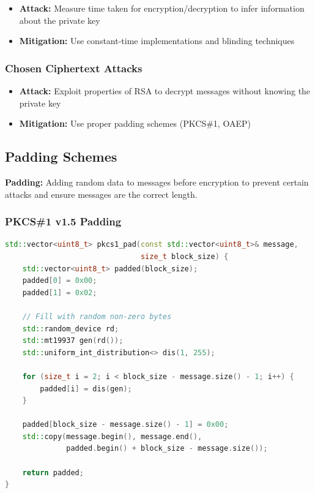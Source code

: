 \documentclass[11pt,a4paper]{article}
\begin{document}
\begin{itemize}
    \item \textbf{Attack:} Measure time taken for encryption/decryption to infer information about the private key
    \item \textbf{Mitigation:} Use constant-time implementations and blinding techniques
\end{itemize}

\subsubsection{Chosen Ciphertext Attacks}

\begin{itemize}
    \item \textbf{Attack:} Exploit properties of RSA to decrypt messages without knowing the private key
    \item \textbf{Mitigation:} Use proper padding schemes (PKCS\#1, OAEP)
\end{itemize}

\subsection{Padding Schemes}

\begin{definitionbox}
\textbf{Padding:} Adding random data to messages before encryption to prevent certain attacks and ensure messages are the correct length.
\end{definitionbox}

\subsubsection{PKCS\#1 v1.5 Padding}

\begin{lstlisting}[language=C++, caption=PKCS#1 v1.5 Padding]
std::vector<uint8_t> pkcs1_pad(const std::vector<uint8_t>& message, 
                               size_t block_size) {
    std::vector<uint8_t> padded(block_size);
    padded[0] = 0x00;
    padded[1] = 0x02;
    
    // Fill with random non-zero bytes
    std::random_device rd;
    std::mt19937 gen(rd());
    std::uniform_int_distribution<> dis(1, 255);
    
    for (size_t i = 2; i < block_size - message.size() - 1; i++) {
        padded[i] = dis(gen);
    }
    
    padded[block_size - message.size() - 1] = 0x00;
    std::copy(message.begin(), message.end(), 
              padded.begin() + block_size - message.size());
    
    return padded;
}
\end{lstlisting}
\end{document}
